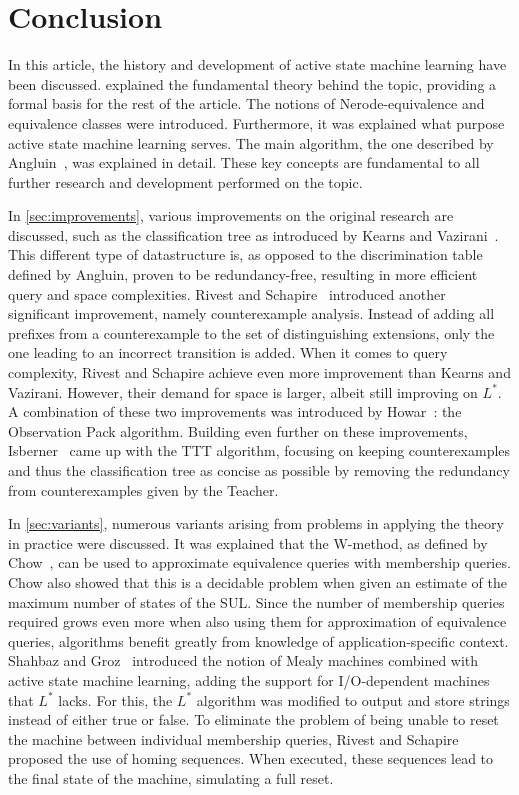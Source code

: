 \documentclass[multi,crop=false,class=article]{standalone}
\begin{document}
\section*{Conclusion}
\label{sec:conclusion}
In this article, the history and development of active state machine learning
have been discussed.  explained the fundamental theory behind the
topic, providing a formal basis for the rest of the article. The notions of
Nerode-equivalence and equivalence classes were introduced. Furthermore, it was
explained what purpose active state machine learning serves. The main algorithm,
the one described by Angluin~\cite{Angluin1987}, was explained in detail. These
key concepts are fundamental to all further research and development performed
on the topic.

In \cref{sec:improvements}, various improvements on the original research are discussed,
such as the classification tree as introduced by Kearns and Vazirani~\cite{Kearns1994}.
This different type of datastructure is, as opposed to the discrimination table
defined by Angluin, proven to be redundancy-free, resulting in more efficient
query and space complexities. Rivest and Schapire~\cite{Rivest1993} introduced
another significant improvement, namely counterexample analysis. Instead of
adding all prefixes from a counterexample to the set of distinguishing
extensions, only the one leading to an incorrect transition is added. When it
comes to query complexity, Rivest and Schapire achieve even more improvement
than Kearns and Vazirani. However, their demand for space is larger, albeit
still improving on $L^*$. A combination of these two improvements was introduced
by Howar~\cite{Howar2012a,Isberner2015a}: the Observation Pack algorithm.
Building even further on these improvements, Isberner~\cite{Isberner2014b} came
up with the TTT algorithm, focusing on keeping counterexamples and thus the
classification tree as concise as possible by removing the redundancy from
counterexamples given by the Teacher.

In \cref{sec:variants}, numerous variants arising from problems in applying
the theory in practice were discussed. It was explained that the W-method,
as defined by Chow~\cite{deRuiter2015,Chow1978}, can be used to approximate equivalence
queries with membership queries. Chow also showed that this is a decidable problem
when given an estimate of the maximum number of states of the SUL.
Since the number of membership queries required grows even more when also using
them for approximation of equivalence queries, algorithms benefit greatly from
knowledge of application-specific context.
Shahbaz and Groz~\cite{Shahbaz2009}
introduced the notion of Mealy machines combined with active state machine
learning, adding the support for I/O-dependent machines that $L^*$ lacks. For
this, the $L^*$ algorithm was modified to output and store strings instead of
either true or false. To eliminate the problem of being unable to reset the
machine between individual membership queries, Rivest and Schapire~\cite{Rivest1993}
proposed the use of homing sequences. When executed, these sequences lead to the
final state of the machine, simulating a full reset.
\end{document}
